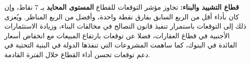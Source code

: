 \textbf{قطاع التشييد والبناء:} تجاوز مؤشر التوقعات للقطاع \textbf{المستوى المحايد} بـ 7 نقاط، وإن كان بأداء أقل من الربع السابق بفارق نقطة واحدة، وأفضل من الربع المناظر. ويُعزى ذلك إلى التوقعات باستمرار تنفيذ قانون التصالح في مخالفات البناء، وزيادة الاستثمارات الأجنبية في قطاع العقارات، فضلا عن توقعات بارتفاع المبيعات مع انخفاض أسعار الفائدة في البنوك، كما ساهمت المشروعات التي تنفذها الدولة في البنية التحتية في دعم توقعات تحسن أداء القطاع خلال الفترة القادمة.
